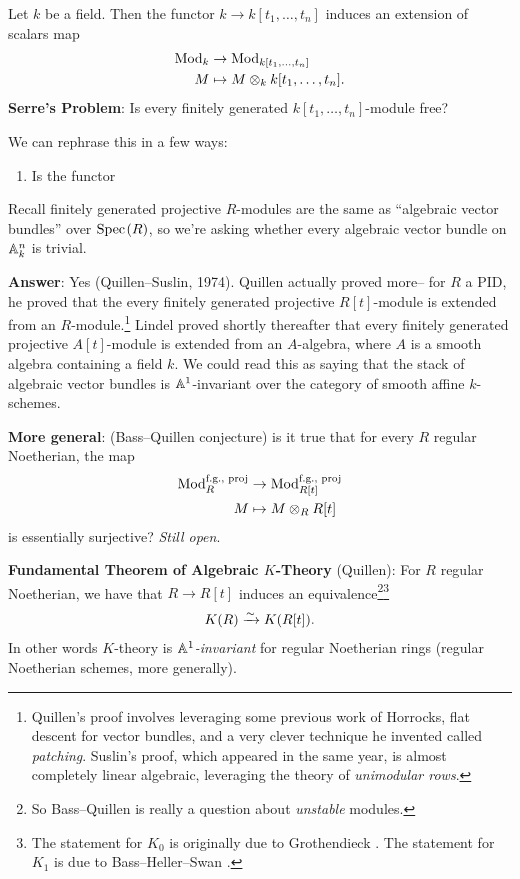\documentclass[11pt,openany]{book}
\begin{document}
\begin{example} Let $k$ be a field. Then the functor $k \to k[t_1, \ldots, t_n]$ induces an extension of scalars map
\begin{equation}\label{eqn:extn-scalars}
\begin{aligned}
    \mathrm{Mod}_k &\to \mathrm{Mod}_{k[t_1, \ldots, t_n]} \\
    M &\mapsto M \otimes_k k[t_1, \ldots, t_n].
\end{aligned}
\end{equation}
\textbf{Serre's Problem}: Is every finitely generated $k[t_1, \ldots, t_n]$-module free?

We can rephrase this in a few ways:
\begin{enumerate}
    \item Is the functor
\end{enumerate}



Recall finitely generated projective $R$-modules are the same as ``algebraic vector bundles'' over $\text{Spec}\hspace{0.1em}(R)$, so we're asking whether every algebraic vector bundle on $\mathbb{A}^n_k$ is trivial.

\textbf{Answer}: Yes (Quillen--Suslin, 1974). Quillen actually proved more-- for $R$ a PID, he proved that the every finitely generated projective $R[t]$-module is extended from an $R$-module.\footnote{%
Quillen's proof involves leveraging some previous work of Horrocks, flat descent for vector bundles, and a very clever technique he invented called \textit{patching}. Suslin's proof, which appeared in the same year, is almost completely linear algebraic, leveraging the theory of \textit{unimodular rows}.} Lindel proved shortly thereafter that every finitely generated projective $A[t]$-module is extended from an $A$-algebra, where $A$ is a smooth algebra containing a field $k$. We could read this as saying that the stack of algebraic vector bundles is $\mathbb{A}^1$-invariant over the category of smooth affine $k$-schemes.
\end{example}

\textbf{More general}: (Bass--Quillen conjecture) is it true that for every $R$ regular Noetherian, the map
\begin{align*}
    \mathrm{Mod}_R^{\text{f.g., proj}} &\to \mathrm{Mod}_{R[t]}^{\text{f.g., proj}} \\
    M &\mapsto M \otimes_R R[t]
\end{align*}
is essentially surjective? \textit{Still open}.

\textbf{Fundamental Theorem of Algebraic $K$-Theory} (Quillen): For $R$ regular Noetherian, we have that $R \to R[t]$ induces an equivalence\footnote{%
So Bass--Quillen is really a question about \textit{unstable} modules.}\footnote{%
The statement for $K_0$ is originally due to Grothendieck \cite[5.6.1.3]{Aravind}. The statement for $K_1$ is due to Bass--Heller--Swan \cite[5.8.2.1]{Aravind}.
}
\begin{align*}
    K(R) \xrightarrow{\sim} K(R[t]).
\end{align*}
%
In other words $K$-theory is \textit{$\mathbb{A}^1$-invariant} for regular Noetherian rings (regular Noetherian schemes, more generally).
\end{document}
